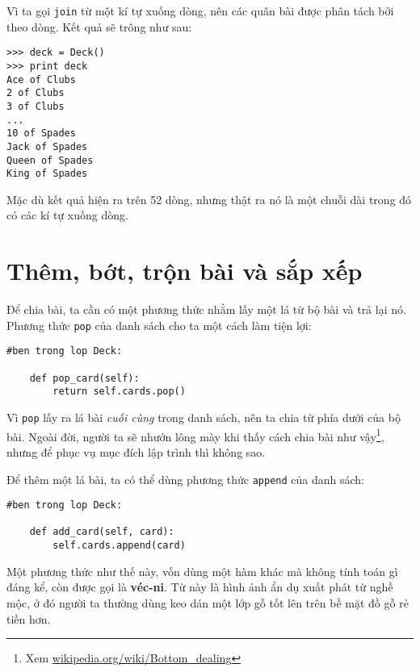 \documentclass[11pt]{book}
\begin{document}

Vì ta gọi {\tt join} từ một kí tự xuống dòng, nên các quân bài
được phân tách bởi theo dòng. Kết quả sẽ trông như sau:

\beforeverb
\begin{verbatim}
>>> deck = Deck()
>>> print deck
Ace of Clubs
2 of Clubs
3 of Clubs
...
10 of Spades
Jack of Spades
Queen of Spades
King of Spades
\end{verbatim}
\afterverb
%
Mặc dù kết quả hiện ra trên 52 dòng, nhưng thật ra
nó là một chuỗi dài trong đó có các kí tự xuống dòng.


\section{Thêm, bớt, trộn bài và sắp xếp}

Để chia bài, ta cần có một phương thức nhằm
lấy một lá từ bộ bài và trả lại nó. 
Phương thức {\tt pop} của danh sách cho ta một cách làm tiện lợi:


\beforeverb
\begin{verbatim}
#ben trong lop Deck:

    def pop_card(self):
        return self.cards.pop()
\end{verbatim}
\afterverb
%
Vì {\tt pop} lấy ra lá bài {\em cuối cùng} trong danh sách, nên ta
chia từ phía dưới của bộ bài. Ngoài đời, người ta sẽ nhướn lông mày
khi thấy cách chia bài như vậy\footnote{Xem \url{wikipedia.org/wiki/Bottom_dealing}},
nhưng để phục vụ mục đích lập trình thì không sao.


Để thêm một lá bài, ta có thể dùng phương thức {\tt append} của danh sách:

\beforeverb
\begin{verbatim}
#ben trong lop Deck:

    def add_card(self, card):
        self.cards.append(card)
\end{verbatim}
\afterverb
%
Một phương thức như thế này, vốn dùng một hàm khác mà không
tính toán gì đáng kể, còn được gọi là {\bf véc-ni}.  Từ này là hình ảnh 
ẩn dụ xuất phát từ nghề mộc, ở đó người ta thường dùng keo dán một lớp
gỗ tốt lên trên bề mặt đồ gỗ rẻ tiền hơn.

\end{document}
